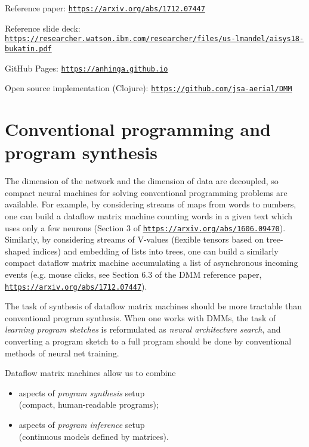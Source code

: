 \documentclass{article}
\begin{document}
Reference paper: \href{https://arxiv.org/abs/1712.07447}{\tt https://arxiv.org/abs/1712.07447}

Reference slide deck: \href{https://researcher.watson.ibm.com/researcher/files/us-lmandel/aisys18-bukatin.pdf}{\footnotesize\tt https://researcher.watson.ibm.com/researcher/files/us-lmandel/aisys18-bukatin.pdf}

GitHub Pages: \href{https://anhinga.github.io/}{\tt https://anhinga.github.io}

Open source implementation (Clojure): \href{https://github.com/jsa-aerial/DMM}{\tt https://github.com/jsa-aerial/DMM}

\section{Conventional programming and program synthesis} The dimension of the network and the dimension
of data are decoupled, so compact neural machines for solving conventional programming problems are available.
For example, by considering streams of maps from words to numbers, one can build a dataflow matrix machine
counting words in a given text which uses only a few neurons 
(Section 3 of \href{https://arxiv.org/abs/1606.09470}{\tt https://arxiv.org/abs/1606.09470}).
Similarly, by considering streams of V-values  (flexible tensors based on tree-shaped indices) and embedding
of lists into trees, one can build a similarly compact dataflow matrix machine
accumulating a list of asynchronous incoming events
(e.g. mouse clicks, see Section 6.3 of the DMM reference paper, \href{https://arxiv.org/abs/1712.07447}{\tt https://arxiv.org/abs/1712.07447}). 

The task of synthesis of dataflow matrix machines
should be more tractable than conventional program synthesis. When one works with DMMs, the task of
{\em learning program sketches} is reformulated as {\em neural architecture search},
and converting a program sketch to a full program should be done by
conventional methods of neural net training. 

\vspace{0.1in}
\noindent
Dataflow matrix machines allow us  to combine

  \begin{itemize}
      \item aspects of {\em program synthesis} setup\\ (compact, human-readable programs);
      \item aspects of {\em program inference} setup\\ (continuous models defined by matrices).
  \end{itemize}
\end{document}
